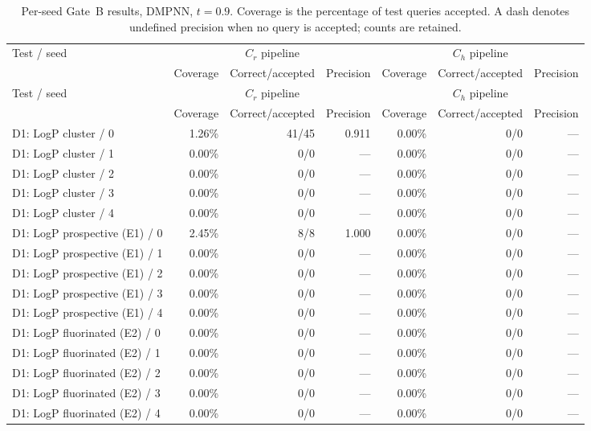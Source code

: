 \begin{longtable}{@{}lrrrrrr@{}}
\caption{Per-seed Gate~B results, DMPNN, $t=0.9$. Coverage is the percentage of test queries accepted. A dash denotes undefined precision when no query is accepted; counts are retained.}\\
\toprule
Test / seed & \multicolumn{3}{c}{$C_r$ pipeline} & \multicolumn{3}{c}{$C_h$ pipeline} \\
 & Coverage & Correct/accepted & Precision & Coverage & Correct/accepted & Precision \\
\midrule
\endfirsthead
\toprule
Test / seed & \multicolumn{3}{c}{$C_r$ pipeline} & \multicolumn{3}{c}{$C_h$ pipeline} \\
 & Coverage & Correct/accepted & Precision & Coverage & Correct/accepted & Precision \\
\midrule
\endhead
\bottomrule
\endfoot
D1: LogP cluster / 0 & 1.26\% & 41/45 & 0.911 & 0.00\% & 0/0 & --- \\
D1: LogP cluster / 1 & 0.00\% & 0/0 & --- & 0.00\% & 0/0 & --- \\
D1: LogP cluster / 2 & 0.00\% & 0/0 & --- & 0.00\% & 0/0 & --- \\
D1: LogP cluster / 3 & 0.00\% & 0/0 & --- & 0.00\% & 0/0 & --- \\
D1: LogP cluster / 4 & 0.00\% & 0/0 & --- & 0.00\% & 0/0 & --- \\
\addlinespace
D1: LogP prospective (E1) / 0 & 2.45\% & 8/8 & 1.000 & 0.00\% & 0/0 & --- \\
D1: LogP prospective (E1) / 1 & 0.00\% & 0/0 & --- & 0.00\% & 0/0 & --- \\
D1: LogP prospective (E1) / 2 & 0.00\% & 0/0 & --- & 0.00\% & 0/0 & --- \\
D1: LogP prospective (E1) / 3 & 0.00\% & 0/0 & --- & 0.00\% & 0/0 & --- \\
D1: LogP prospective (E1) / 4 & 0.00\% & 0/0 & --- & 0.00\% & 0/0 & --- \\
\addlinespace
D1: LogP fluorinated (E2) / 0 & 0.00\% & 0/0 & --- & 0.00\% & 0/0 & --- \\
D1: LogP fluorinated (E2) / 1 & 0.00\% & 0/0 & --- & 0.00\% & 0/0 & --- \\
D1: LogP fluorinated (E2) / 2 & 0.00\% & 0/0 & --- & 0.00\% & 0/0 & --- \\
D1: LogP fluorinated (E2) / 3 & 0.00\% & 0/0 & --- & 0.00\% & 0/0 & --- \\
D1: LogP fluorinated (E2) / 4 & 0.00\% & 0/0 & --- & 0.00\% & 0/0 & --- \\

\end{longtable}
